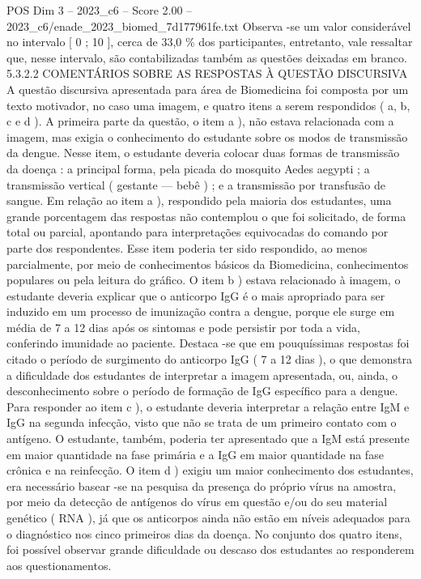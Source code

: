\begin{textsample}{POS Dim 3 – 2023\_c6 – Score 2.00 – 2023\_c6/enade\_2023\_biomed\_7d177961fe.txt}
Observa -se um valor considerável no intervalo [ 0 ; 10 ], cerca de 33,0 \% dos participantes, entretanto, vale ressaltar que, nesse intervalo, são contabilizadas também as questões deixadas em branco. 5.3.2.2 COMENTÁRIOS SOBRE AS RESPOSTAS À QUESTÃO DISCURSIVA A questão discursiva apresentada para área de Biomedicina foi composta por um texto motivador, no caso uma imagem, e quatro itens a serem respondidos ( a, b, c e d ).
A primeira parte da questão, o item a ), não estava relacionada com a imagem, mas exigia o conhecimento do estudante sobre os modos de transmissão da dengue.
Nesse item, o estudante deveria colocar duas formas de transmissão da doença : a principal forma, pela picada do mosquito Aedes aegypti ; a transmissão vertical ( gestante — bebê ) ; e a transmissão por transfusão de sangue.
Em relação ao item a ), respondido pela maioria dos estudantes, uma grande porcentagem das respostas não contemplou o que foi solicitado, de forma total ou parcial, apontando para interpretações equivocadas do comando por parte dos respondentes.
Esse item poderia ter sido respondido, ao menos parcialmente, por meio de conhecimentos básicos da Biomedicina, conhecimentos populares ou pela leitura do gráfico.
O item b ) estava relacionado à imagem, o estudante deveria explicar que o anticorpo IgG é o mais apropriado para ser induzido em um processo de imunização contra a dengue, porque ele surge em média de 7 a 12 dias após os sintomas e pode persistir por toda a vida, conferindo imunidade ao paciente.
Destaca -se que em pouquíssimas respostas foi citado o período de surgimento do anticorpo IgG ( 7 a 12 dias ), o que demonstra a dificuldade dos estudantes de interpretar a imagem apresentada, ou, ainda, o desconhecimento sobre o período de formação de IgG específico para a dengue.
Para responder ao item c ), o estudante deveria interpretar a relação entre IgM e IgG na segunda infecção, visto que não se trata de um primeiro contato com o antígeno.
O estudante, também, poderia ter apresentado que a IgM está presente em maior quantidade na fase primária e a IgG em maior quantidade na fase crônica e na reinfecção.
O item d ) exigiu um maior conhecimento dos estudantes, era necessário basear -se na pesquisa da presença do próprio vírus na amostra, por meio da detecção de antígenos do vírus em questão e/ou do seu material genético ( RNA ), já que os anticorpos ainda não estão em níveis adequados para o diagnóstico nos cinco primeiros dias da doença.
No conjunto dos quatro itens, foi possível observar grande dificuldade ou descaso dos estudantes ao responderem aos questionamentos.

\end{textsample}

